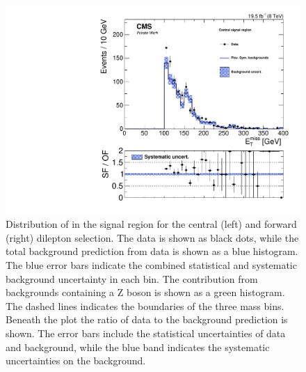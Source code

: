 \begin{figure}[htbp]
\begin{minipage}[t]{0.49\textwidth}
\end{minipage}
\begin{minipage}[t]{0.49\textwidth}
\includegraphics[width=\textwidth]{plots/results/rSFOFDependencies/rSFOFDependency_SignalCentral_MET_Full2012_SF_lowMass.pdf}
\end{minipage}
\caption{Distribution of \mll in the signal region for the central (left) and forward (right) dilepton selection. The data is shown as black dots, while the total background prediction from data is shown as a blue histogram. The blue error bars indicate the combined statistical and systematic background uncertainty in each bin. The contribution from backgrounds containing a Z boson is shown as a green histogram. The dashed lines indicates the boundaries of the three mass bins. Beneath the plot the ratio of data to the background prediction is shown. The error bars include the statistical uncertainties of data and background, while the blue band indicates the systematic uncertainties on the background. }
\label{fig:timeDependece}
\end{figure}


